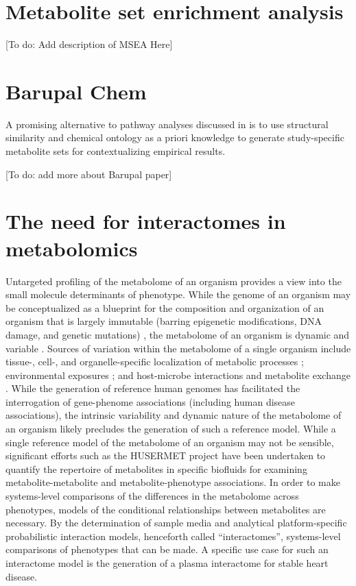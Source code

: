\begin{DoubleSpace*}
\section{Metabolite set enrichment analysis}
[To do: Add description of MSEA Here]

\section{Barupal Chem}
A promising alternative to pathway analyses discussed in \cite{barupal2017} is to use structural similarity and chemical ontology as a priori knowledge to generate study-specific metabolite sets for contextualizing empirical results. 

[To do: add more about Barupal paper]

\section{The need for interactomes in metabolomics}
Untargeted profiling of the metabolome of an organism provides a view into the small molecule determinants of phenotype. While the genome of an organism may be conceptualized as a blueprint for the composition and organization of an organism that is largely immutable (barring epigenetic modifications, DNA damage, and genetic mutations) \cite{gao2015,keating2015,martincorena2015}, the metabolome of an organism is dynamic and variable \cite{dallmann2012,krycer2017}. Sources of variation within the metabolome of a single organism include tissue-, cell-, and organelle-specific localization of metabolic processes \cite{shlomi2008,voet2013}; environmental exposures \cite{southam2014}; and host-microbe interactions and metabolite exchange \cite{moriya2017}. While the generation of reference human genomes has facilitated the interrogation of gene-phenome associations (including human disease associations), the intrinsic variability and dynamic nature of the metabolome of an organism likely precludes the generation of such a reference model. While a single reference model of the metabolome of an organism may not be sensible, significant efforts such as the HUSERMET project \cite{dunn2014} have been undertaken to quantify the repertoire of metabolites in specific biofluids for examining metabolite-metabolite and metabolite-phenotype associations. In order to make systems-level comparisons of the differences in the metabolome across phenotypes, models of the conditional relationships between metabolites are necessary. By the determination of sample media and analytical platform-specific probabilistic interaction models, henceforth called ``interactomes'', systems-level comparisons of phenotypes that can be made. A specific use case for such an interactome model is the generation of a plasma interactome for stable heart disease.


\end{DoubleSpace*}
